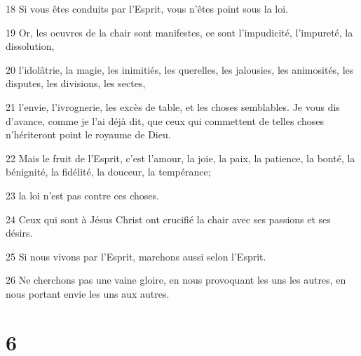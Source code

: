 \par 18 Si vous êtes conduits par l'Esprit, vous n'êtes point sous la loi.
\par 19 Or, les oeuvres de la chair sont manifestes, ce sont l'impudicité, l'impureté, la dissolution,
\par 20 l'idolâtrie, la magie, les inimitiés, les querelles, les jalousies, les animosités, les disputes, les divisions, les sectes,
\par 21 l'envie, l'ivrognerie, les excès de table, et les choses semblables. Je vous dis d'avance, comme je l'ai déjà dit, que ceux qui commettent de telles choses n'hériteront point le royaume de Dieu.
\par 22 Mais le fruit de l'Esprit, c'est l'amour, la joie, la paix, la patience, la bonté, la bénignité, la fidélité, la douceur, la tempérance;
\par 23 la loi n'est pas contre ces choses.
\par 24 Ceux qui sont à Jésus Christ ont crucifié la chair avec ses passions et ses désirs.
\par 25 Si nous vivons par l'Esprit, marchons aussi selon l'Esprit.
\par 26 Ne cherchons pas une vaine gloire, en nous provoquant les uns les autres, en nous portant envie les uns aux autres.

\chapter{6}

